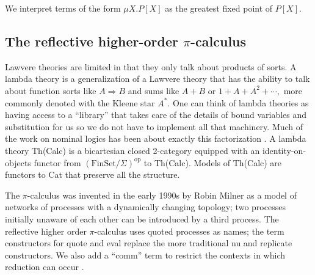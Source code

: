 \documentclass{llncs}
\renewcommand{\:}{\colon}
\newcommand{\FinSet}{\mathrm{FinSet}}
\newcommand{\op}{\mathrm{op}}
\begin{document}
We interpret terms of the form $\mu X.P[X]$ as the greatest fixed point of $P[X].$

\subsection{The reflective higher-order $\pi$-calculus}

Lawvere theories are limited in that they only talk about products of sorts.  A lambda theory is a generalization of a Lawvere theory that has the ability to talk about function sorts like $A \Rightarrow B$ and sums like $A+B$ or $1 + A + A^2 + \cdots,$ more commonly denoted with the Kleene star $A^*.$  One can think of lambda theories as having access to a ``library'' that takes care of the details of bound variables and substitution for us so we do not have to implement all that machinery.  Much of the work on nominal logics has been about exactly this factorization \cite{GabbayMJ:picfm}.  A lambda theory Th(Calc) is a bicartesian closed 2-category equipped with an identity-on-objects functor from $(\FinSet/\Sigma)^{\op}$ to Th(Calc).  Models of Th(Calc) are functors to Cat that preserve all the structure.

The $\pi$-calculus was invented in the early 1990s by Robin Milner as a model of networks of processes with a dynamically changing topology; two processes initially unaware of each other can be introduced by a third process.  The reflective higher order $\pi$-calculus uses quoted processes as names; the term constructors for quote and eval replace the more traditional nu and replicate constructors.  We also add a ``comm'' term to restrict the contexts in which reduction can occur \cite{DBLP:journals/corr/StayM15}.
\end{document}
